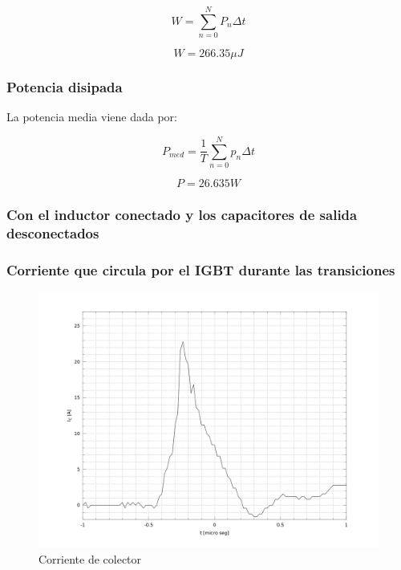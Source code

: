 \documentclass[a4paper,10pt]{article}
\begin{document}
\begin{equation}
W = \sum_{n=0}^N P_n \Delta t
\end{equation}

\begin{equation}
	W = 266.35  \mu J
\end{equation}
\subsubsection*{Potencia disipada}

La potencia media viene dada por:

\begin{equation}
P_{med} = \frac{1}{T} \sum_{n=0}^N p_n \Delta t
\end{equation}

\begin{equation}
	P = 26.635 \unit{W} 
\end{equation}

\subsubsection{Con el inductor conectado y los capacitores de salida desconectados}

\subsubsection*{Corriente que circula por el IGBT durante las transiciones}

\begin{figure}[H] %
\begin{center}
\includegraphics[scale=0.2]{./imagenes/Ic3.png}
\caption{Corriente de colector}
 \label{fig:Ic3}
\end{center}
\end{figure}
\end{document}
